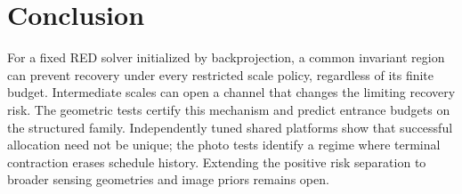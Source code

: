 \section{Conclusion}
For a fixed RED solver initialized by backprojection, a common
invariant region can prevent recovery under every restricted scale
policy, regardless of its finite budget. Intermediate scales can
open a channel that changes the limiting recovery risk. The
geometric tests certify this mechanism and predict entrance budgets
on the structured family. Independently tuned shared platforms
show that successful allocation need not be unique; the photo tests
identify a regime where terminal contraction erases schedule history.
Extending the positive risk separation to broader sensing geometries
and image priors remains open.
